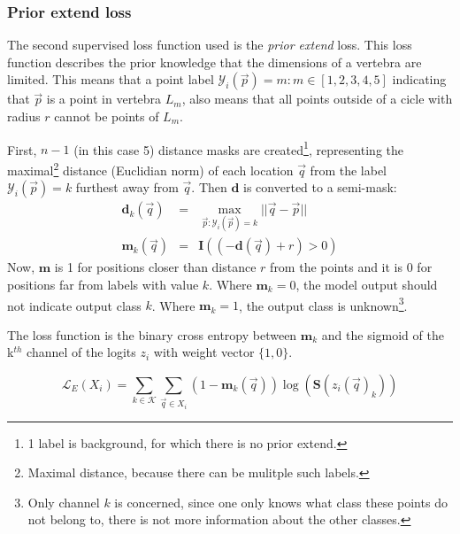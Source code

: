 \subsubsection{Prior extend loss}
The second supervised loss function used is the \textit{prior extend} loss.
This loss function describes the prior knowledge that the dimensions of a vertebra are limited. 
This means that a point label $\mathcal{Y}_i(\vec{p})=m: m\in[1,2,3,4,5]$ indicating that $\vec{p}$ is a point in vertebra $L_m$, also means that all points outside of a cicle with radius $r$ cannot be points of $L_m$.

First, $n-1$ (in this case 5) distance masks are created\footnote{1 label is background, for which there is no prior extend.}, 
representing the maximal\footnote{Maximal distance, because there can be mulitple such labels.} distance (Euclidian norm) of each location $\vec{q}$ from the label $\mathcal{Y}_i(\vec{p})=k$ furthest away from $\vec{q}$.
Then $\mathbf{d}$ is converted to a semi-mask:
\begin{eqnarray}
    \mathbf{d}_k(\vec{q}) &=& \max_{\vec{p}:\mathcal{Y}_i(\vec{p})=k}||\vec{q} - \vec{p}||\\
    \mathbf{m}_k(\vec{q}) &=& \mathbf{I}\left( (-\mathbf{d}(\vec{q}) + r) > 0 \right)
\end{eqnarray}
Now, $\mathbf{m}$ is 1 for positions closer than distance $r$ from the points and it is 0 for positions far from labels with value $k$.
Where $\mathbf{m}_k=0$, the model output should not indicate output class $k$. Where $\mathbf{m}_k=1$, the output class is unknown\footnote{Only channel $k$ is concerned, since one only knows what class these points do not belong to, there is not more information about the other classes.}.

The loss function is the binary cross entropy between $\mathbf{m}_k$ and the sigmoid of the k$^{th}$ channel of the logits $z_i$ with weight vector $\{1, 0\}$.

\begin{equation}
    \mathcal{L}_E(X_i) = \sum_{k\in\mathcal{K}}\sum_{\vec{q}\in X_i}  (1-\mathbf{m}_k(\vec{q})) \log(\mathbf{S}(z_i(\vec{q})_k)) 
\end{equation}



